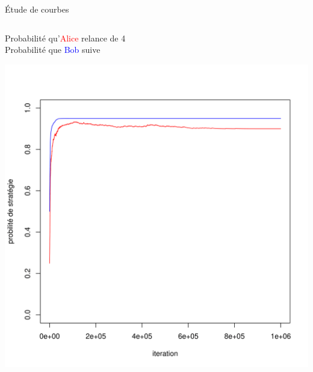\begin{frame}{Étude de courbes}
\begin{columns}
        \begin{column}{0.5 \textwidth}
         \begin{small}
         \hspace{-0.24 cm} Probabilité qu'\textcolor{red}{Alice} relance de 4\\ Probabilité que \textcolor{blue}{Bob} suive\\
          \end{small}
        \centering
            \includegraphics[width =\textwidth]{Images/Courbes/LRI/Relance4.png}
       
    \end{column}
    \end{columns}
\end{frame}

